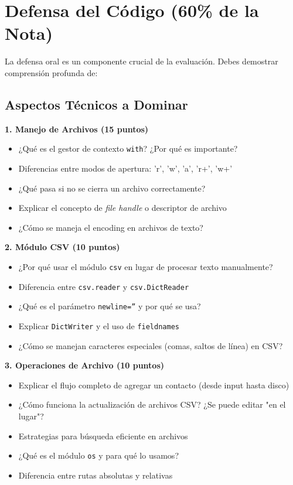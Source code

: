 \documentclass[11pt,letterpaper]{article}
\begin{document}
\section{Defensa del Código (60\% de la Nota)}

La defensa oral es un componente crucial de la evaluación. Debes demostrar comprensión profunda de:

\subsection{Aspectos Técnicos a Dominar}

\textbf{1. Manejo de Archivos (15 puntos)}
\begin{itemize}
    \item ¿Qué es el gestor de contexto \texttt{with}? ¿Por qué es importante?
    \item Diferencias entre modos de apertura: 'r', 'w', 'a', 'r+', 'w+'
    \item ¿Qué pasa si no se cierra un archivo correctamente?
    \item Explicar el concepto de \textit{file handle} o descriptor de archivo
    \item ¿Cómo se maneja el encoding en archivos de texto?
\end{itemize}

\textbf{2. Módulo CSV (10 puntos)}
\begin{itemize}
    \item ¿Por qué usar el módulo \texttt{csv} en lugar de procesar texto manualmente?
    \item Diferencia entre \texttt{csv.reader} y \texttt{csv.DictReader}
    \item ¿Qué es el parámetro \texttt{newline=''} y por qué se usa?
    \item Explicar \texttt{DictWriter} y el uso de \texttt{fieldnames}
    \item ¿Cómo se manejan caracteres especiales (comas, saltos de línea) en CSV?
\end{itemize}

\textbf{3. Operaciones de Archivo (10 puntos)}
\begin{itemize}
    \item Explicar el flujo completo de agregar un contacto (desde input hasta disco)
    \item ¿Cómo funciona la actualización de archivos CSV? ¿Se puede editar "en el lugar"?
    \item Estrategias para búsqueda eficiente en archivos
    \item ¿Qué es el módulo \texttt{os} y para qué lo usamos?
    \item Diferencia entre rutas absolutas y relativas
\end{itemize}
\end{document}
